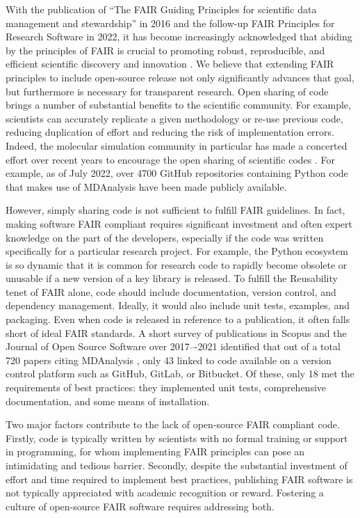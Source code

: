 \documentclass[9pt,whitepaper]{livecoms}
\begin{document}
With the publication of “The FAIR Guiding Principles for scientific data management and stewardship” in 2016 and the follow-up FAIR Principles for Research Software in 2022, it has become increasingly acknowledged that abiding by the principles of FAIR is crucial to promoting robust, reproducible, and efficient scientific discovery and innovation  \cite{chue_hong_fair_2021, wilkinson_fair_2016}. We believe that extending FAIR principles to include open-source release not only significantly advances that goal, but furthermore is necessary for transparent research. Open sharing of code brings a number of substantial benefits to the scientific community. For example, scientists can accurately replicate a given methodology or re-use previous code, reducing duplication of effort and reducing the risk of implementation errors. Indeed, the molecular simulation community in particular has made a concerted effort over recent years to encourage the open sharing of scientific codes \cite{walters_code_2020}. For example, as of July 2022, over 4700 GitHub repositories containing Python code that makes use of MDAnalysis \cite{michaud-agrawal_mdanalysis_2011, gowers_mdanalysis_2016} have been made publicly available.

However, simply sharing code is not sufficient to fulfill FAIR guidelines. In fact, making software FAIR compliant requires significant investment and often expert knowledge on the part of the developers, especially if the code was written specifically for a particular research project. For example, the Python ecosystem is so dynamic that it is common for research code to rapidly become obsolete or unusable if a new version of a key library is released. To fulfill the Reusability tenet of FAIR alone, code should include documentation, version control, and dependency management. Ideally, it would also include unit tests, examples, and packaging. Even when code is released in reference to a publication, it often falls short of ideal FAIR standards. A short survey of publications in Scopus \cite{noauthor_scopus_nodate} and the Journal of Open Source Software \cite{noauthor_journal_nodate} over 2017–-2021 identified that out of a total 720 papers citing MDAnalysis \cite{michaud-agrawal_mdanalysis_2011, gowers_mdanalysis_2016}, only 43 linked to code available on a version control platform such as GitHub, GitLab, or Bitbucket. Of these, only 18 met the requirements of best practices: they implemented unit tests, comprehensive documentation, and some means of installation.

Two major factors contribute to the lack of open-source FAIR compliant code. Firstly, code is typically written by scientists with no formal training or support in programming, for whom implementing FAIR principles can pose an intimidating and tedious barrier. Secondly, despite the substantial investment of effort and time required to implement best practices, publishing FAIR software is not typically appreciated with academic recognition or reward. Fostering a culture of open-source FAIR software requires addressing both.
\end{document}
